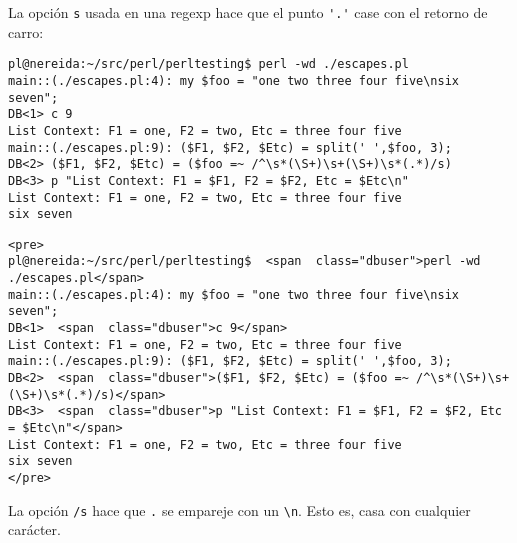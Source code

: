 
La opción \verb|s| usada en una regexp 
hace que el punto \verb|'.'| case con el retorno
de carro:

\begin{latexonly}
\begin{verbatim}
pl@nereida:~/src/perl/perltesting$ perl -wd ./escapes.pl
main::(./escapes.pl:4): my $foo = "one two three four five\nsix seven";
DB<1> c 9
List Context: F1 = one, F2 = two, Etc = three four five
main::(./escapes.pl:9): ($F1, $F2, $Etc) = split(' ',$foo, 3);
DB<2> ($F1, $F2, $Etc) = ($foo =~ /^\s*(\S+)\s+(\S+)\s*(.*)/s)
DB<3> p "List Context: F1 = $F1, F2 = $F2, Etc = $Etc\n"
List Context: F1 = one, F2 = two, Etc = three four five
six seven
\end{verbatim}
\end{latexonly}
\begin{verbatim}
<pre>
pl@nereida:~/src/perl/perltesting$  <span  class="dbuser">perl -wd ./escapes.pl</span>
main::(./escapes.pl:4): my $foo = "one two three four five\nsix seven";
DB<1>  <span  class="dbuser">c 9</span>
List Context: F1 = one, F2 = two, Etc = three four five
main::(./escapes.pl:9): ($F1, $F2, $Etc) = split(' ',$foo, 3);
DB<2>  <span  class="dbuser">($F1, $F2, $Etc) = ($foo =~ /^\s*(\S+)\s+(\S+)\s*(.*)/s)</span>
DB<3>  <span  class="dbuser">p "List Context: F1 = $F1, F2 = $F2, Etc = $Etc\n"</span>
List Context: F1 = one, F2 = two, Etc = three four five
six seven
</pre>
\end{verbatim}


La opción \verb|/s| hace que \verb|.| se empareje con 
un \verb|\n|.
Esto es, casa con cualquier carácter.

